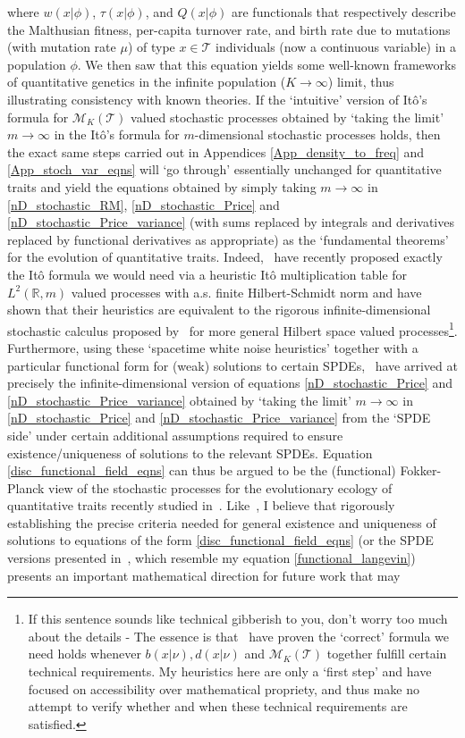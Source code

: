 where $w(x|\phi)$, $\tau(x|\phi)$, and $Q(x|\phi)$ are functionals that respectively describe the Malthusian fitness, per-capita turnover rate, and birth rate due to mutations (with mutation rate $\mu$) of type $x \in \mathcal{T}$ individuals (now a continuous variable) in a population $\phi$. We then saw that this equation yields some well-known frameworks of quantitative genetics in the infinite population ($K \to \infty$) limit, thus illustrating consistency with known theories. If the `intuitive' version of It\^{o}'s formula for $\mathcal{M}_K(\mathcal{T})$ valued stochastic processes obtained by `taking the limit' $m \to \infty$ in the It\^{o}'s formula for $m$-dimensional stochastic processes holds, then the exact same steps carried out in Appendices \ref{App_density_to_freq} and \ref{App_stoch_var_eqns} will `go through' essentially unchanged for quantitative traits and yield the equations obtained by simply taking $m \to \infty$ in \eqref{nD_stochastic_RM}, \eqref{nD_stochastic_Price} and \eqref{nD_stochastic_Price_variance} (with sums replaced by integrals and derivatives replaced by functional derivatives as appropriate) as the `fundamental theorems' for the evolution of quantitative traits. Indeed,~\cite{week_white_2021} have recently proposed exactly the It\^o formula we would need via a heuristic It\^o multiplication table for $L^2(\mathbb{R}, m)$ valued processes with a.s. finite Hilbert-Schmidt norm and have shown that their heuristics are equivalent to the rigorous infinite-dimensional stochastic calculus proposed by~\cite{da_prato_stochastic_2014} for more general Hilbert space valued processes\footnote{If this sentence sounds like technical gibberish to you, don't worry too much about the details - The essence is that~\cite{week_white_2021} have proven the `correct' formula we need holds whenever $b(x|\nu), d(x|\nu)$ and $\mathcal{M}_K(\mathcal{T})$ together fulfill certain technical requirements. My heuristics here are only a `first step' and have focused on accessibility over mathematical propriety, and thus make no attempt to verify whether and when these technical requirements are satisfied.}. Furthermore, using these `spacetime white noise heuristics' together with a particular functional form for (weak) solutions to certain SPDEs,~\cite{week_white_2021} have arrived at precisely the infinite-dimensional version of equations \eqref{nD_stochastic_Price} and \eqref{nD_stochastic_Price_variance} obtained by `taking the limit' $m \to \infty$ in \eqref{nD_stochastic_Price} and \eqref{nD_stochastic_Price_variance} from the `SPDE side' under certain additional assumptions required to ensure existence/uniqueness of solutions to the relevant SPDEs. Equation \eqref{disc_functional_field_eqns} can thus be argued to be the (functional) Fokker-Planck view of the stochastic processes for the evolutionary ecology of quantitative traits recently studied in~\cite{week_white_2021}. Like~\cite{week_white_2021}, I believe that rigorously establishing the precise criteria needed for general existence and uniqueness of solutions to equations of the form \eqref{disc_functional_field_eqns} (or the SPDE versions presented in~\cite{week_white_2021}, which resemble my equation \eqref{functional_langevin}) presents an important mathematical direction for future work that may 